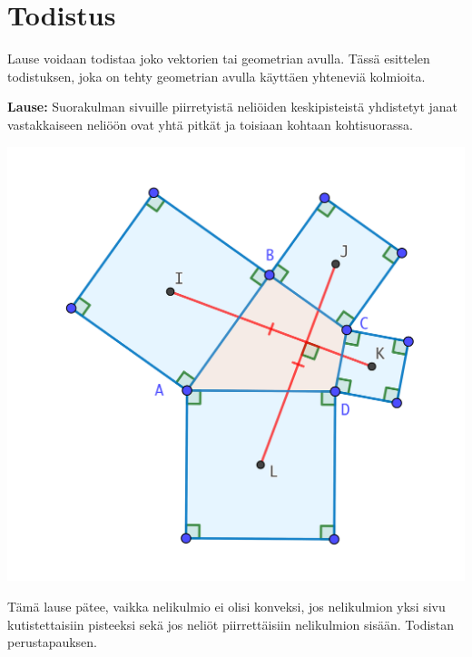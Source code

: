 \documentclass{scrartcl}
\begin{document}
\pagebreak
\section{Todistus}
Lause voidaan todistaa joko vektorien tai geometrian avulla. Tässä esittelen todistuksen, joka on tehty geometrian avulla käyttäen yhteneviä kolmioita.

\medskip
\textbf{Lause:} Suorakulman sivuille piirretyistä neliöiden keskipisteistä yhdistetyt janat vastakkaiseen neliöön ovat yhtä pitkät ja toisiaan kohtaan kohtisuorassa. 
\begin{center}
    \includegraphics[scale=0.3]{todistuskuva}
\end{center}

Tämä lause pätee, vaikka nelikulmio ei olisi konveksi, jos nelikulmion yksi sivu kutistettaisiin pisteeksi sekä jos neliöt piirrettäisiin nelikulmion sisään. Todistan perustapauksen.
\end{document}
